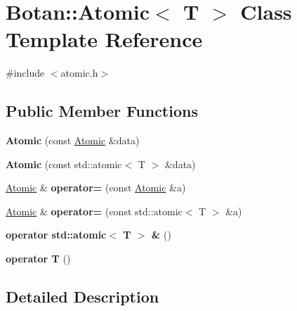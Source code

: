 \hypertarget{class_botan_1_1_atomic}{}\section{Botan\+:\+:Atomic$<$ T $>$ Class Template Reference}
\label{class_botan_1_1_atomic}


{\ttfamily \#include $<$atomic.\+h$>$}

\subsection*{Public Member Functions}
\begin{DoxyCompactItemize}
\item 
\mbox{\label{class_botan_1_1_atomic_aff0c0127720365839815fcbf96c36893}} 
{\bfseries Atomic} (const \hyperlink{class_botan_1_1_atomic}{Atomic} \&data)
\item 
\mbox{\label{class_botan_1_1_atomic_ab0dd01bcbc20804ca1b3607e7495c2a2}} 
{\bfseries Atomic} (const std\+::atomic$<$ T $>$ \&data)
\item 
\mbox{\label{class_botan_1_1_atomic_a162ef567d1d8aa2a32956290d8a572e2}} 
\hyperlink{class_botan_1_1_atomic}{Atomic} \& {\bfseries operator=} (const \hyperlink{class_botan_1_1_atomic}{Atomic} \&a)
\item 
\mbox{\label{class_botan_1_1_atomic_ab161a076ffec827889fcbd8f23c29a1c}} 
\hyperlink{class_botan_1_1_atomic}{Atomic} \& {\bfseries operator=} (const std\+::atomic$<$ T $>$ \&a)
\item 
\mbox{\label{class_botan_1_1_atomic_ae11b6b3622de4e46946d1b46620dae29}} 
{\bfseries operator std\+::atomic$<$ T $>$ \&} ()
\item 
\mbox{\label{class_botan_1_1_atomic_aad990a5bf5e43a29bc3120c7a6a3bbc6}} 
{\bfseries operator T} ()
\end{DoxyCompactItemize}


\subsection{Detailed Description}
